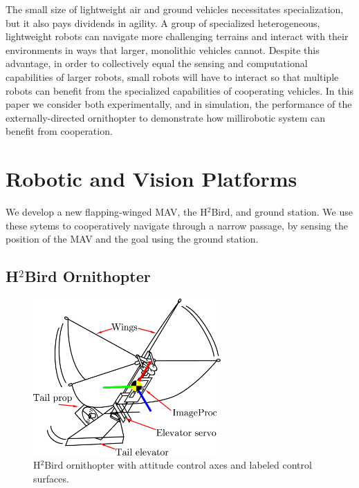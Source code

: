 \documentclass{aamas2013}
\begin{document}
The small size of lightweight air and ground vehicles necessitates 
specialization, but it also pays dividends in agility. A group of specialized 
heterogeneous, lightweight robots can navigate more challenging terrains and 
interact with their environments in ways that larger, monolithic vehicles 
cannot. Despite this advantage, in order to collectively equal the sensing and 
computational capabilities of larger robots, small robots will have to interact 
so that multiple robots can benefit from the specialized capabilities of 
cooperating vehicles. In this paper we consider both experimentally, and in 
simulation, the performance of the externally-directed ornithopter to 
demonstrate how millirobotic system can benefit from cooperation.

\section{Robotic and Vision Platforms}

We develop a new flapping-winged MAV, the H$^2$Bird, and ground station. We
use these sytems to cooperatively navigate through a narrow passage, by
sensing the position of the MAV and the goal using the ground station.

\subsection{H$^2$Bird Ornithopter}

\begin{figure}[!tb]
\centering
\includegraphics[height=170pt]{figures/h2bird_axes.pdf}
\caption{H$^2$Bird ornithopter with attitude control axes and labeled 
control surfaces.}
\label{fig:h2Bird_axes}
\end{figure}
\end{document}
